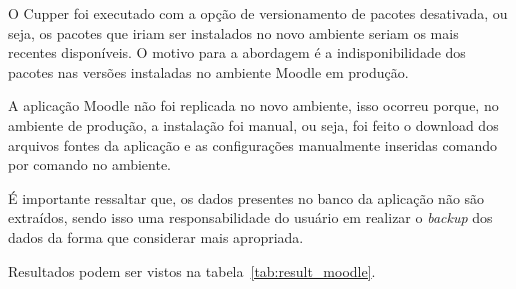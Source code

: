 O Cupper foi executado com a opção de versionamento de pacotes desativada,
ou seja, os pacotes que iriam ser instalados no novo ambiente seriam os
mais recentes disponíveis. O motivo para a abordagem é a indisponibilidade
dos pacotes nas versões instaladas no ambiente Moodle em produção.

A aplicação Moodle não foi replicada no novo ambiente, isso ocorreu porque,
no ambiente de produção, a instalação foi manual, ou seja, foi feito o download dos
arquivos fontes da aplicação e as configurações manualmente inseridas comando por
comando no ambiente.

É importante ressaltar que, os dados presentes no banco da aplicação não são
extraídos, sendo isso uma responsabilidade do usuário em realizar o \textit{backup} dos
dados da forma que considerar mais apropriada.

Resultados podem ser vistos na tabela~\ref{tab:result_moodle}.
